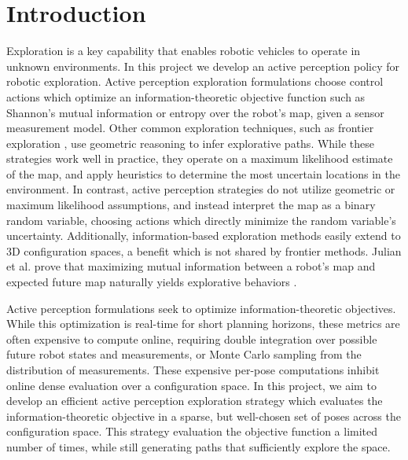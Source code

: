 \section{Introduction}
\label{sec:introduction}

Exploration is a key capability that enables robotic vehicles to operate in
unknown environments. In this project we develop an active perception policy
for robotic exploration. Active perception exploration formulations
choose control actions which optimize an information-theoretic objective
function such as Shannon's mutual information or entropy
\cite{bourgault2002information, stachniss2005information} over the robot's map,
given a sensor measurement model. Other common exploration techniques, such as frontier
exploration \cite{}, use geometric reasoning to infer explorative paths.
While these strategies work well in practice, they operate on a
maximum likelihood estimate of the map, and apply heuristics to determine the most uncertain
locations in the environment. In contrast, active perception strategies do not utilize
geometric or maximum likelihood assumptions, and instead interpret the map as a binary
random variable, choosing actions which directly minimize the random variable's uncertainty.
Additionally, information-based exploration methods easily extend to 3D
configuration spaces, a benefit which is not shared by frontier methods.
Julian et al. prove that maximizing mutual information between a
robot's map and expected future map naturally yields explorative behaviors
\cite{julian2013mutual}.

Active perception formulations seek to optimize information-theoretic
objectives. While this optimization is real-time for short planning horizons,
these metrics are often expensive to compute online, requiring double
integration over possible future robot states and measurements, or Monte Carlo sampling
from the distribution of measurements. These expensive per-pose computations inhibit
online dense evaluation over a configuration space. In this project, we aim to develop an
efficient active perception exploration strategy which evaluates the
information-theoretic objective in a sparse, but well-chosen set of poses across the
configuration space. This strategy evaluation the objective function
a limited number of times, while still generating paths that sufficiently explore the space.

